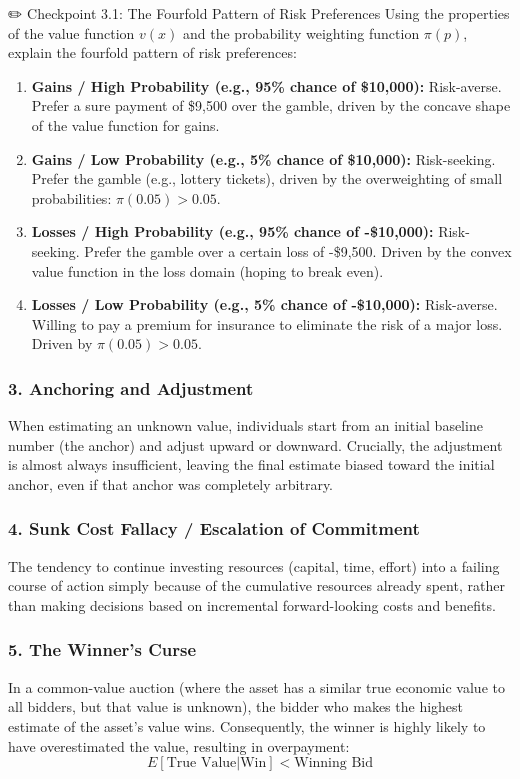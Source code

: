 \documentclass[11pt,a4paper]{article}
\begin{document}
\begin{checkpointbox}{✏️ Checkpoint 3.1: The Fourfold Pattern of Risk Preferences}
Using the properties of the value function $v(x)$ and the probability weighting function $\pi(p)$, explain the fourfold pattern of risk preferences:
\begin{enumerate}
    \item \textbf{Gains / High Probability (e.g., 95\% chance of \$10,000):} Risk-averse. Prefer a sure payment of \$9,500 over the gamble, driven by the concave shape of the value function for gains.
    \item \textbf{Gains / Low Probability (e.g., 5\% chance of \$10,000):} Risk-seeking. Prefer the gamble (e.g., lottery tickets), driven by the overweighting of small probabilities: $\pi(0.05) > 0.05$.
    \item \textbf{Losses / High Probability (e.g., 95\% chance of -\$10,000):} Risk-seeking. Prefer the gamble over a certain loss of -\$9,500. Driven by the convex value function in the loss domain (hoping to break even).
    \item \textbf{Losses / Low Probability (e.g., 5\% chance of -\$10,000):} Risk-averse. Willing to pay a premium for insurance to eliminate the risk of a major loss. Driven by $\pi(0.05) > 0.05$.
\end{enumerate}
\end{checkpointbox}

\subsubsection{3. Anchoring and Adjustment}
When estimating an unknown value, individuals start from an initial baseline number (the anchor) and adjust upward or downward. Crucially, the adjustment is almost always insufficient, leaving the final estimate biased toward the initial anchor, even if that anchor was completely arbitrary.

\subsubsection{4. Sunk Cost Fallacy / Escalation of Commitment}
The tendency to continue investing resources (capital, time, effort) into a failing course of action simply because of the cumulative resources already spent, rather than making decisions based on incremental forward-looking costs and benefits.

\subsubsection{5. The Winner's Curse}
In a common-value auction (where the asset has a similar true economic value to all bidders, but that value is unknown), the bidder who makes the highest estimate of the asset's value wins. Consequently, the winner is highly likely to have overestimated the value, resulting in overpayment:
\begin{equation}
    E[\text{True Value} | \text{Win}] < \text{Winning Bid}
\end{equation}
\end{document}
